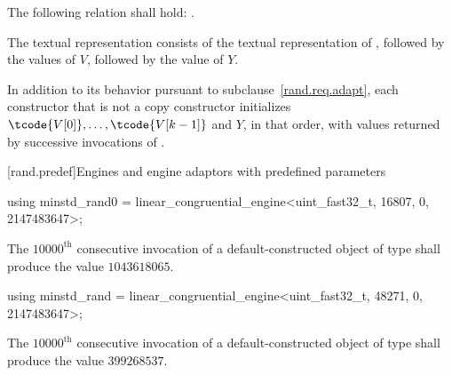 \pnum
The following relation shall hold:
  .

\pnum
The textual representation%
%
consists of
 the textual representation of ,
followed by
 the  values of $V$,
followed by
 the value of $Y$.

\pnum
In addition to its behavior
pursuant to subclause~\ref{rand.req.adapt},
each constructor%
that is not a copy constructor
initializes $\tcode{V[0]}, \dotsc, \tcode{V[k-1]}$ and $Y$,
in that order,
with values returned by successive invocations of .%




[rand.predef]{Engines and engine adaptors with predefined parameters}%
%
%

%
%
\begin{itemdecl}
using minstd_rand0 =
      linear_congruential_engine<uint_fast32_t, 16807, 0, 2147483647>;
\end{itemdecl}

\begin{itemdescr}
\pnum\required
 The $10000^\text{th}$ consecutive invocation
 of a default-constructed object
 of type 
 shall produce the value $1043618065$.
\end{itemdescr}

%
%
\begin{itemdecl}
using minstd_rand =
      linear_congruential_engine<uint_fast32_t, 48271, 0, 2147483647>;
\end{itemdecl}

\begin{itemdescr}
\pnum\required
 The $10000^\text{th}$ consecutive invocation
 of a default-constructed object
 of type 
 shall produce the value $399268537$.
\end{itemdescr}

